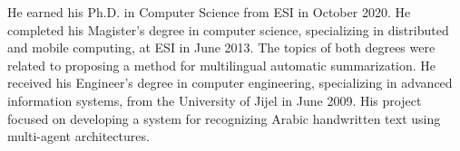 \documentclass{KBook}
\begin{document}
\begin{tcolorbox}[colback=my-grey,
	colframe=my-grey,  
	center, arc=0pt,outer arc=0pt,
	valign=top, 
	halign=flush left,
	width=\textwidth]
\begin{minipage}[t]{0.80\textwidth}
		He earned his Ph.D. in Computer Science from ESI in October 2020. 
		He completed his Magister's degree in computer science, specializing in distributed and mobile computing, at ESI in June 2013. 
		The topics of both degrees were related to proposing a method for multilingual automatic summarization. 
		He received his Engineer's degree in computer engineering, specializing in advanced information systems, from the University of Jijel in June 2009. 
		His project focused on developing a system for recognizing Arabic handwritten text using multi-agent architectures.	
	\end{minipage}
	
	
\end{tcolorbox}
\end{document}
